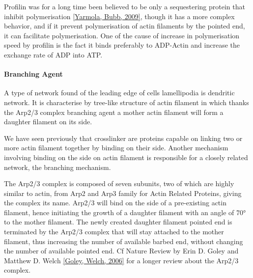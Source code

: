 \documentclass[A4paperpaper,11pt,english]{sphinxmanual}
\begin{document}
Profilin was for a long time been believed to be only a sequestering protein
that inhibit polymerisation {\hyperref[parts/part1:yarmola2009]{{[}Yarmola, Bubb,  2009{]}}}, though it has a more complex
behavior, and if it prevent polymerisation of actin filaments by the pointed
end, it can facilitate polymerisation. One of the cause of increase in
polymerisation speed by profilin is the fact it binds preferably to ADP-Actin
and increase the exchange rate of ADP into ATP.


\paragraph{Branching Agent}
\label{parts/part1:branching-agent}
A type of network found of the leading edge of cells lamellipodia is dendritic
network. It is characterise by tree-like structure of actin filament in which
thanks the Arp2/3 complex branching agent a mother actin filament will form a
daughter filament on its side.

We have seen previously that crosslinker  are proteins capable on linking two
or more actin filament together by binding on their side. Another mechanism
involving binding on the side on actin filament is responsible for a closely
related network, the branching mechanism.

The Arp2/3 complex is composed of seven subunits, two of which are highly
similar to actin, from Arp2 and Arp3 family for Actin Related Proteins,
giving the complex its name. Arp2/3 will bind on the side of a pre-existing
actin filament, hence initiating the growth of a daughter filament with an angle of
70° to the mother filament. The newly created daughter filament pointed end
is terminated by the Arp2/3 complex that will stay attached to the mother
filament, thus increasing the number of available barbed end, without changing
the number of available pointed end. Cf Nature Review by Erin D. Goley and
Matthew D. Welch {\hyperref[parts/part1:goley2006]{{[}Goley, Welch,  2006{]}}} for  a longer review about the Arp2/3
complex.
\end{document}
